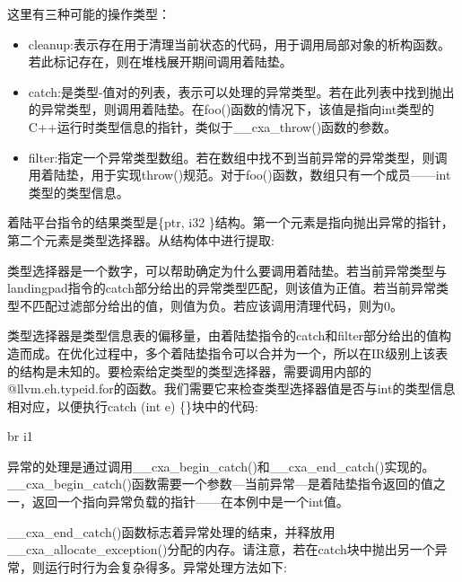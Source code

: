 这里有三种可能的操作类型：

\begin{itemize}
\item
cleanup:表示存在用于清理当前状态的代码，用于调用局部对象的析构函数。若此标记存在，则在堆栈展开期间调用着陆垫。

\item
catch:是类型-值对的列表，表示可以处理的异常类型。若在此列表中找到抛出的异常类型，则调用着陆垫。在foo()函数的情况下，该值是指向int类型的C++运行时类型信息的指针，类似于\_\_cxa\_throw()函数的参数。

\item
filter:指定一个异常类型数组。若在数组中找不到当前异常的异常类型，则调用着陆垫，用于实现throw()规范。对于foo()函数，数组只有一个成员——int类型的类型信息。
\end{itemize}

着陆平台指令的结果类型是\{ptr, i32 \}结构。第一个元素是指向抛出异常的指针，第二个元素是类型选择器。从结构体中进行提取:

\begin{shell}
\end{shell}

类型选择器是一个数字，可以帮助确定为什么要调用着陆垫。若当前异常类型与landingpad指令的catch部分给出的异常类型匹配，则该值为正值。若当前异常类型不匹配过滤部分给出的值，则值为负。若应该调用清理代码，则为0。

类型选择器是类型信息表的偏移量，由着陆垫指令的catch和filter部分给出的值构造而成。在优化过程中，多个着陆垫指令可以合并为一个，所以在IR级别上该表的结构是未知的。要检索给定类型的类型选择器，需要调用内部的@llvm.eh.typeid.for的函数。我们需要它来检查类型选择器值是否与int的类型信息相对应，以便执行catch (int e) \{\}块中的代码:

\begin{shell}
br i1 %
\end{shell}

异常的处理是通过调用\_\_cxa\_begin\_catch()和\_\_cxa\_end\_catch()实现的。\_\_cxa\_begin\_catch()函数需要一个参数—当前异常—是着陆垫指令返回的值之一，返回一个指向异常负载的指针——在本例中是一个int值。

\_\_cxa\_end\_catch()函数标志着异常处理的结束，并释放用\_\_cxa\_allocate\_exception()分配的内存。请注意，若在catch块中抛出另一个异常，则运行时行为会复杂得多。异常处理方法如下:

